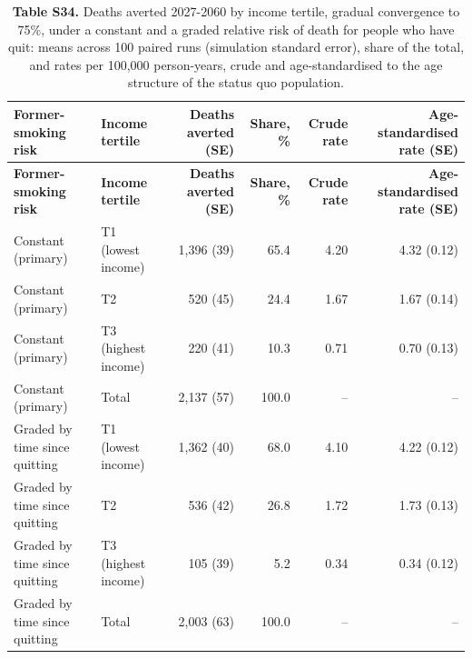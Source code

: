 \scriptsize
\setlength{\tabcolsep}{3pt}
\begin{longtable}{p{3.6cm}p{2.4cm}rrrr}
\caption{\textbf{Table S34.} Deaths averted 2027-2060 by income tertile, gradual convergence to 75\%, under a constant and a graded relative risk of death for people who have quit: means across 100 paired runs (simulation standard error), share of the total, and rates per 100,000 person-years, crude and age-standardised to the age structure of the status quo population.}\\
\toprule
\textbf{Former-smoking risk} & \textbf{Income tertile} & \textbf{Deaths averted (SE)} & \textbf{Share, \%} & \textbf{Crude rate} & \textbf{Age-standardised rate (SE)} \\
\midrule
\endfirsthead
\toprule
\textbf{Former-smoking risk} & \textbf{Income tertile} & \textbf{Deaths averted (SE)} & \textbf{Share, \%} & \textbf{Crude rate} & \textbf{Age-standardised rate (SE)} \\
\midrule
\endhead
\bottomrule
\endfoot
Constant (primary) & T1 (lowest income) & 1,396 (39) & 65.4 & 4.20 & 4.32 (0.12) \\
Constant (primary) & T2 &   520 (45) & 24.4 & 1.67 & 1.67 (0.14) \\
Constant (primary) & T3 (highest income) &   220 (41) & 10.3 & 0.71 & 0.70 (0.13) \\
Constant (primary) & Total & 2,137 (57) & 100.0 & -- & -- \\
Graded by time since quitting & T1 (lowest income) & 1,362 (40) & 68.0 & 4.10 & 4.22 (0.12) \\
Graded by time since quitting & T2 &   536 (42) & 26.8 & 1.72 & 1.73 (0.13) \\
Graded by time since quitting & T3 (highest income) &   105 (39) & 5.2 & 0.34 & 0.34 (0.12) \\
Graded by time since quitting & Total & 2,003 (63) & 100.0 & -- & -- \\
\end{longtable}
\normalsize
